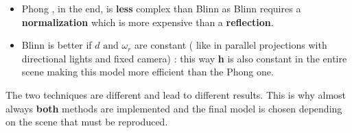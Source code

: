\begin{itemize}
\begin{itemize}
\item Phong , in the end, is \textbf{less} complex than Blinn as Blinn requires a \textbf{normalization} which is more expensive than a \textbf{reflection}.
\item Blinn is better if $d \text{ and } \omega_r$ are constant ( like in parallel projections with directional lights and fixed camera) : this way \textbf{h} is also constant in the entire scene making this model more efficient than the Phong one.
\end{itemize} 
The two techniques are different and lead to different results. This is why almost always \textbf{both} methods are implemented and the final model is chosen depending on the scene that must be reproduced.
\end{itemize}


